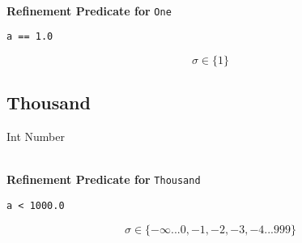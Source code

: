 \textbf{\\ Refinement Predicate for } \texttt{One}
\begin{verbatim}
a == 1.0
\end{verbatim}

$$\sigma \in \{ 1 \}$$

\subsection{Thousand}
Int Number

\textbf{\\ Refinement Predicate for } \texttt{Thousand}
\begin{verbatim}
a < 1000.0
\end{verbatim}

$$\sigma \in \{ -\infty ... 0, -1, -2, -3, -4 ... 999 \}$$

